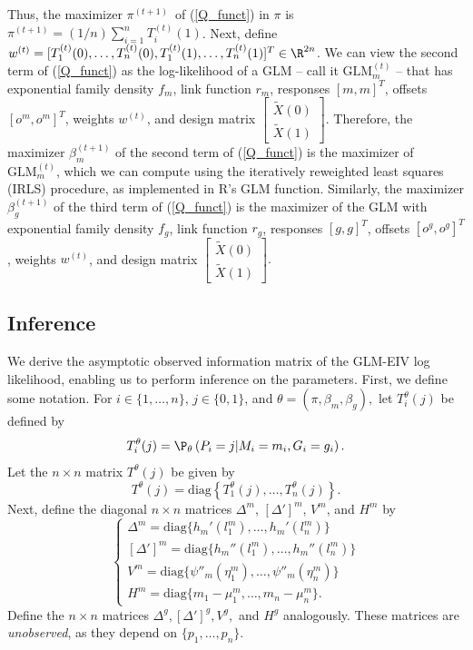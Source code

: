 \documentclass[11pt]{article}
\begin{document}
\begin{appendices}
\begin{refsection}
Thus, the maximizer $\pi^{(t+1)}$ of (\ref{Q_funct}) in $\pi$ is $\pi^{(t+1)} = (1/n)\sum_{i=1}^n T^{(t)}_i(1)$. Next, define $w^{(t)} = [T^{(t)}_1(0), \dots, T^{(t)}_n(0), T^{(t)}_1(1), \dots, T^{(t)}_n(1)]^T \in \R^{2n}$. We can view the second term of (\ref{Q_funct}) as the log-likelihood of a GLM -- call it $\textrm{GLM}^{(t)}_m$ -- that has exponential family density $f_m$, link function $r_m$, responses $[m,m]^T$, offsets $[o^m, o^m]^T$, weights $w^{(t)}$, and design matrix $\begin{bmatrix} \tilde{X}(0) \\ \tilde{X}(1) \end{bmatrix}.$ Therefore, the maximizer $\beta^{(t+1)}_m$ of the second term of (\ref{Q_funct}) is the maximizer of $\textrm{GLM}^{(t)}_m$, which we can compute using the iteratively reweighted least squares (IRLS) procedure, as implemented in R's GLM function. Similarly, the maximizer $\beta^{(t+1)}_g$ of the third term of (\ref{Q_funct}) is the maximizer of the GLM with exponential family density $f_g$, link function $r_g$, responses $[g,g]^T$, offsets $[o^g, o^g]^T$, weights $w^{(t)}$, and design matrix $\begin{bmatrix} \tilde{X}(0) \\ \tilde{X}(1) \end{bmatrix}.$

\subsection{Inference}
We derive the asymptotic observed information matrix of the GLM-EIV log likelihood, enabling us to perform inference on the parameters. First, we define some notation. For $i \in \{1, \dots, n\}$, $j \in \{0, 1\}$, and $\theta = (\pi, \beta_m, \beta_g),$ let $T^\theta_i(j)$ be defined by
$$T^\theta_i(j) = \P_\theta\left(P_i = j | M_i = m_i, G_i = g_i\right).$$ Let the $n \times n$ matrix $T^\theta(j)$ be given by $$T^\theta(j) = \textrm{diag}\left\{T^\theta_1(j), \dots, T^\theta_n(j)\right\}.$$
Next, define the diagonal $n \times n$ matrices $\Delta^m$, $[\Delta']^m$, $V^m$, and $H^m$ by
$$
\begin{cases}
	\Delta^m = \textrm{diag} \{h_m'(l_1^m), \dots, h_m'(l_n^m)\} \\
	[\Delta']^m = \textrm{diag} \{h_m''(l_1^m), \dots, h_m''(l_n^m) \} \\
	V^m = \textrm{diag} \{ \psi''_m( \eta^m_1), \dots, \psi''_m( \eta^m_n) \} \\
	H^m = \textrm{diag} \{ m_1 - \mu_1^m, \dots, m_n - \mu_n^m\}.
\end{cases} 
$$ Define the $n \times n$ matrices $\Delta^g, [\Delta']^g, V^g,$ and $H^g$ analogously. These matrices are \textit{unobserved}, as they depend on $\{p_1, \dots, p_n\}$.


\end{refsection}
\end{appendices}
\end{document}
